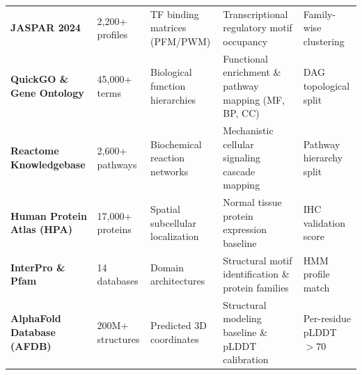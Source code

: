 \documentclass[11pt,a4paper]{article}
\begin{document}
\begin{table}[h!]
\begin{tabular}{lp{3.2cm}p{3.0cm}p{4.1cm}l}
\textbf{JASPAR 2024} & 2,200+ profiles & TF binding matrices (PFM/PWM) & Transcriptional regulatory motif occupancy & Family-wise clustering \\
\textbf{QuickGO \& Gene Ontology} & 45,000+ terms & Biological function hierarchies & Functional enrichment \& pathway mapping (MF, BP, CC) & DAG topological split \\
\textbf{Reactome Knowledgebase} & 2,600+ pathways & Biochemical reaction networks & Mechanistic cellular signaling cascade mapping & Pathway hierarchy split \\
\textbf{Human Protein Atlas (HPA)} & 17,000+ proteins & Spatial subcellular localization & Normal tissue protein expression baseline & IHC validation score \\
\textbf{InterPro \& Pfam} & 14 databases & Domain architectures & Structural motif identification \& protein families & HMM profile match \\
\textbf{AlphaFold Database (AFDB)} & 200M+ structures & Predicted 3D coordinates & Structural modeling baseline \& pLDDT calibration & Per-residue pLDDT $>70$ \\
\bottomrule
\end{tabular}
\end{table}

\vspace{1em}
\end{document}
